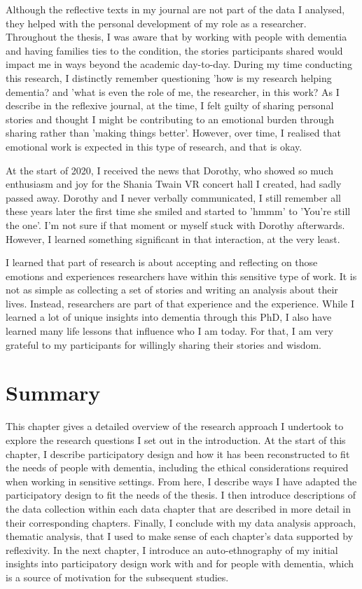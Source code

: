 Although the reflective texts in my journal are not part of the data I analysed, they helped with the personal development of my role as a researcher. Throughout the thesis, I was aware that by working with people with dementia and having families ties to the condition, the stories participants shared would impact me in ways beyond the academic day-to-day. During my time conducting this research, I distinctly remember questioning 'how is my research helping dementia? and 'what is even the role of me, the researcher, in this work? As I describe in the reflexive journal, at the time, I felt guilty of sharing personal stories and thought I might be contributing to an emotional burden through sharing rather than 'making things better'. However, over time, I realised that emotional work is expected in this type of research, and that is okay. 

At the start of 2020, I received the news that Dorothy, who showed so much enthusiasm and joy for the Shania Twain VR concert hall I created, had sadly passed away. Dorothy and I never verbally communicated, I still remember all these years later the first time she smiled and started to 'hmmm' to 'You're still the one'. I'm not sure if that moment or myself stuck with Dorothy afterwards. However, I learned something significant in that interaction, at the very least.

I learned that part of research is about accepting and reflecting on those emotions and experiences researchers have within this sensitive type of work. It is not as simple as collecting a set of stories and writing an analysis about their lives. Instead, researchers are part of that experience and the experience. While I learned a lot of unique insights into dementia through this PhD, I also have learned many life lessons that influence who I am today. For that, I am very grateful to my participants for willingly sharing their stories and wisdom.

\section{Summary}
\label{Method:summary}
This chapter gives a detailed overview of the research approach I undertook to explore the research questions I set out in the introduction. At the start of this chapter, I describe participatory design and how it has been reconstructed to fit the needs of people with dementia, including the ethical considerations required when working in sensitive settings. From here, I describe ways I have adapted the participatory design to fit the needs of the thesis. I then introduce descriptions of the data collection within each data chapter that are described in more detail in their corresponding chapters. Finally, I conclude with my data analysis approach, thematic analysis, that I used to make sense of each chapter's data supported by reflexivity. In the next chapter, I introduce an auto-ethnography of my initial insights into participatory design work with and for people with dementia, which is a source of motivation for the subsequent studies.
